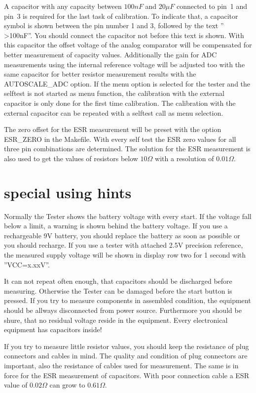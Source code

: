 A capacitor with any capacity between \(100 nF\) and \(20 \mu F\) connected to pin~1 and pin~3 is
required for the last task of calibration.
To indicate that, a capacitor symbol is shown between the pin number 1 and 3, followed by the text '' \textgreater 100nF''.
You should connect the capacitor not before this text is shown.
With this capacitor the offset voltage of the analog comparator will be compensated for better measurement
of capacity values.  
Additionally the gain for ADC measurements using the internal reference voltage will be adjusted too 
with the same capacitor for better resistor measurement results with the AUTOSCALE\_ADC option.
If the menu option is selected for the tester and the selftest is not started as menu function,
the calibration with the external capacitor is only done for the first time calibration.
The calibration  with the external capacitor can be repeated with a selftest call as menu selection.

The zero offset for the ESR measurement will be preset with the option ESR\_ZERO in the Makefile.
With every self test the ESR zero values for all three pin combinations are determined.
The solution for the ESR measurement is also used to get the values of resistors below \(10 \Omega\) with
a resolution of \(0.01 \Omega\).


\section{special using hints}
Normally the Tester shows the battery voltage with every start. If the voltage fall below a limit,
a warning is shown behind the battery voltage. If you use a rechargeable 9V battery, you should replace
the battery as soon as possible or you should recharge.
If you use a tester with attached 2.5V precision reference, the measured supply voltage will be shown
in display row two for 1 second with ''VCC=x.xxV''.

It can not repeat often enough, that capacitors should be discharged before measuring.
Otherwise the Tester can be damaged before the start button is pressed.
If you try to measure components in assembled condition, the equipment should be allways disconnected from power source.
Furthermore you should be shure, that no residual voltage reside in the equipment.
Every electronical equipment has capacitors inside!

If you try to measure little resistor values, you should keep the resistance of plug connectors and cables in mind.
The quality and condition of plug connectors are important, also the resistance of cables used for measurement.
The same is in force for the ESR measurement of capacitors.
With poor connection cable a ESR value of \(0.02 \Omega\) can grow to \(0.61 \Omega\).

